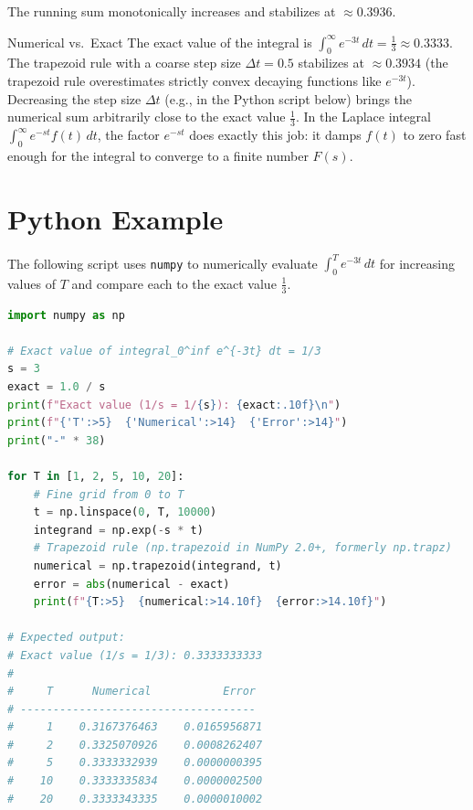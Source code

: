 \documentclass[12pt,a4paper]{article}
\begin{document}
\medskip
\noindent The running sum monotonically increases and stabilizes at $\approx 0.3936$.

\begin{learnbox}{Numerical vs.\ Exact}
The exact value of the integral is $\int_0^\infty e^{-3t}\,dt = \frac{1}{3} \approx 0.3333$.  The trapezoid rule with a coarse step size $\Delta t = 0.5$ stabilizes at $\approx 0.3934$ (the trapezoid rule overestimates strictly convex decaying functions like $e^{-3t}$). Decreasing the step size $\Delta t$ (e.g., in the Python script below) brings the numerical sum arbitrarily close to the exact value $\frac{1}{3}$.  In the
Laplace integral $\int_0^\infty e^{-st}f(t)\,dt$, the factor $e^{-st}$ does
exactly this job: it damps $f(t)$ to zero fast enough for the integral to
converge to a finite number $F(s)$.
\end{learnbox}

\section{Python Example }

The following script uses \texttt{numpy} to numerically evaluate
$\int_0^T e^{-3t}\,dt$ for increasing values of $T$ and compare each to the
exact value $\frac{1}{3}$.

\begin{lstlisting}[language=Python, caption={Convergence of Laplace integral for $s=3$}]
import numpy as np

# Exact value of integral_0^inf e^{-3t} dt = 1/3
s = 3
exact = 1.0 / s
print(f"Exact value (1/s = 1/{s}): {exact:.10f}\n")
print(f"{'T':>5}  {'Numerical':>14}  {'Error':>14}")
print("-" * 38)

for T in [1, 2, 5, 10, 20]:
    # Fine grid from 0 to T
    t = np.linspace(0, T, 10000)
    integrand = np.exp(-s * t)
    # Trapezoid rule (np.trapezoid in NumPy 2.0+, formerly np.trapz)
    numerical = np.trapezoid(integrand, t)
    error = abs(numerical - exact)
    print(f"{T:>5}  {numerical:>14.10f}  {error:>14.10f}")

# Expected output:
# Exact value (1/s = 1/3): 0.3333333333
#
#     T      Numerical           Error
# ------------------------------------
#     1    0.3167376463    0.0165956871
#     2    0.3325070926    0.0008262407
#     5    0.3333332939    0.0000000395
#    10    0.3333335834    0.0000002500
#    20    0.3333343335    0.0000010002
\end{lstlisting}
\end{document}
